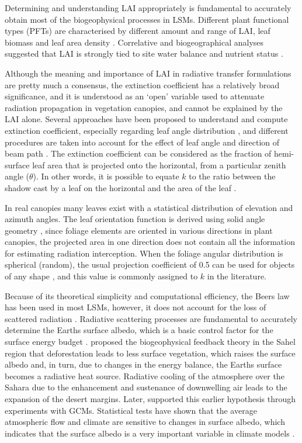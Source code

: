 Determining and understanding LAI appropriately is fundamental to accurately obtain most of the biogeophysical processes in LSMs. Different plant functional types (PFTs) are characterised by different amount and range of LAI, leaf biomass and leaf area density \citep{Asner2003}. Correlative and biogeographical analyses suggested that LAI is strongly tied to site water balance and nutrient status \citep{Woodward1987,Scheffer2005}.

Although the meaning and importance of LAI in radiative transfer formulations are pretty much a consensus, the extinction coefficient has a relatively broad significance, and it is understood as an `open' variable used to attenuate radiation propagation in vegetation canopies, and cannot be explained by the LAI alone.
Several approaches have been proposed to understand and compute extinction coefficient, especially regarding leaf angle distribution \citep{Ross1981}, and different procedures are taken into account for the effect of leaf angle and direction of beam path \citep{Wang2007}. The extinction coefficient can be considered as the fraction of hemi-surface leaf area that is projected onto the horizontal, from a particular zenith angle ($\theta$). In other words, it is possible to equate $k$ to the ratio between the shadow cast by a leaf on the horizontal and the area of the leaf \citep{Monteith1990}.

In real canopies many leaves exist with a statistical distribution of elevation and azimuth angles. The leaf orientation function is derived using solid angle geometry \citep{Ross1981,Myneni1989}, since foliage elements are oriented in various directions in plant canopies, the projected area in one direction does not contain all the information for estimating radiation interception. When the foliage angular distribution is spherical (random), the usual projection coefficient of 0.5 can be used for objects of any shape \citep{Chen1997}, and this value is commonly assigned to $k$ in the literature.

Because of its theoretical simplicity and computational efficiency, the Beer\textsinglequote s law has been used in most LSMs, however, it does not account for the loss of scattered radiation \citep{Wang2003}. Radiative scattering processes are fundamental to accurately determine the Earth\textquotesingle s surface albedo, which is a basic control factor for the surface energy budget \citep{Dickinson1983}. \citet{Charney1975} proposed the biogeophysical feedback theory in the Sahel region that deforestation leads to less surface vegetation, which raises the surface albedo and, in turn, due to changes in the energy balance, the Earth\textquotesingle s surface becomes a radiative heat source. Radiative cooling of the atmosphere over the Sahara due to the enhancement and sustenance of downwelling air leads to the expansion of the desert margins. Later, \citet{Charney1977} supported this earlier hypothesis through experiments with GCMs. Statistical tests have shown that the average atmospheric flow and climate are sensitive to changes in surface albedo, which indicates that the surface albedo is a very important variable in climate models \citep{Dai2007}.

